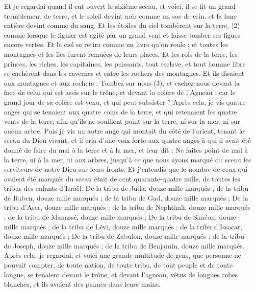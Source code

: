 \begin{multicols}{2}
Et je regardai quand il eut ouvert le sixième sceau, et voici, il se fit un grand tremblement de terre, et le soleil devint noir comme un sac de crin, et la lune entière devint comme du sang.
Et les étoiles du ciel tombèrent sur la terre, (2) comme lorsque le figuier est agité par un grand vent et laisse tomber ses figues encore vertes.
Et le ciel se retira comme un livre qu'on roule ; et toutes les montagnes et les îles furent remuées de leurs places.
Et les rois de la terre, les princes, les riches, les capitaines, les puissants, tout esclave, et tout homme libre se cachèrent dans les cavernes et entre les rochers des montagnes.
Et ils disaient aux montagnes et aux rochers : Tombez sur nous (3), et cachez-nous devant la face de celui qui est assis sur le trône, et devant la colère de l'Agneau ;
car le grand jour de sa colère est venu, et qui peut subsister ?
\VerseOne{}Après cela, je vis quatre anges qui se tenaient aux quatre coins de la terre, et qui retenaient les quatre vents de la terre, afin qu’ils ne soufflent point sur la terre, ni sur la mer, ni sur aucun arbre.
Puis je vis un autre ange qui montait du côté de l'orient, tenant le sceau du Dieu vivant, et il cria d’une voix forte aux quatre anges à qui il avait été donné de faire du mal à la terre et à la mer,
et leur dit : Ne faites point de mal à la terre, ni à la mer, ni aux arbres, jusqu'à ce que nous ayons marqué du sceau les serviteurs de notre Dieu sur leurs fronts.
Et j'entendis que le nombre de ceux qui avaient été marqués du sceau était de cent quarante-quatre mille, de toutes les tribus des enfants d'Israël.
De la tribu de Juda, douze mille marqués ; de la tribu de Ruben, douze mille marqués ; de la tribu de Gad, douze mille marqués ;
De la tribu d'Aser, douze mille marqués ; de la tribu de Nephthali, douze mille marqués ; de la tribu de Manassé, douze mille marqués ;
De la tribu de Siméon, douze mille marqués ; de la tribu de Lévi, douze mille marqués ; de la tribu d'Issacar, douze mille marqués ;
De la tribu de Zabulon, douze mille marqués ; de la tribu de Joseph, douze mille marqués ; de la tribu de Benjamin, douze mille marqués.
Après cela, je regardai, et voici une grande multitude de gens, que personne ne pouvait compter, de toute nation, de toute tribu, de tout peuple et de toute langue, se tenaient devant le trône, et devant l'agneau, vêtus de longues robes blanches, et ils avaient des palmes dans leurs mains.

\end{multicols}
